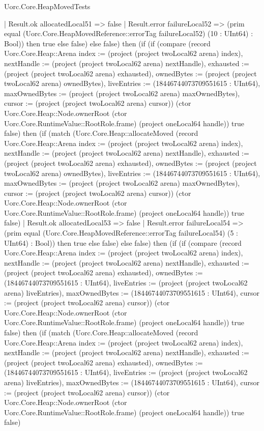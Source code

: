 \begin{lexlean}{Uorc.Core.HeapMovedTests}
\begin{semanticmodule}
{        | Result.ok allocatedLocal51 => false
        | Result.error failureLocal52 => (prim equal (Uorc.Core.HeapMovedReference::errorTag failureLocal52) (10 : UInt64) : Bool)) then true else false) else false) then (if (if (compare (record Uorc.Core.Heap::Arena {index := (project (project twoLocal62 arena) index), nextHandle := (project (project twoLocal62 arena) nextHandle), exhausted := (project (project twoLocal62 arena) exhausted), ownedBytes := (project (project twoLocal62 arena) ownedBytes), liveEntries := (18446744073709551615 : UInt64), maxOwnedBytes := (project (project twoLocal62 arena) maxOwnedBytes), cursor := (project (project twoLocal62 arena) cursor)}) (ctor Uorc.Core.Heap::Node.ownerRoot (ctor Uorc.Core.RuntimeValue::RootRole.frame) (project oneLocal64 handle)) true false) then (if (match (Uorc.Core.Heap::allocateMoved (record Uorc.Core.Heap::Arena {index := (project (project twoLocal62 arena) index), nextHandle := (project (project twoLocal62 arena) nextHandle), exhausted := (project (project twoLocal62 arena) exhausted), ownedBytes := (project (project twoLocal62 arena) ownedBytes), liveEntries := (18446744073709551615 : UInt64), maxOwnedBytes := (project (project twoLocal62 arena) maxOwnedBytes), cursor := (project (project twoLocal62 arena) cursor)}) (ctor Uorc.Core.Heap::Node.ownerRoot (ctor Uorc.Core.RuntimeValue::RootRole.frame) (project oneLocal64 handle)) true false)
        | Result.ok allocatedLocal53 => false
        | Result.error failureLocal54 => (prim equal (Uorc.Core.HeapMovedReference::errorTag failureLocal54) (5 : UInt64) : Bool)) then true else false) else false) then (if (if (compare (record Uorc.Core.Heap::Arena {index := (project (project twoLocal62 arena) index), nextHandle := (project (project twoLocal62 arena) nextHandle), exhausted := (project (project twoLocal62 arena) exhausted), ownedBytes := (18446744073709551615 : UInt64), liveEntries := (project (project twoLocal62 arena) liveEntries), maxOwnedBytes := (18446744073709551615 : UInt64), cursor := (project (project twoLocal62 arena) cursor)}) (ctor Uorc.Core.Heap::Node.ownerRoot (ctor Uorc.Core.RuntimeValue::RootRole.frame) (project oneLocal64 handle)) true false) then (if (match (Uorc.Core.Heap::allocateMoved (record Uorc.Core.Heap::Arena {index := (project (project twoLocal62 arena) index), nextHandle := (project (project twoLocal62 arena) nextHandle), exhausted := (project (project twoLocal62 arena) exhausted), ownedBytes := (18446744073709551615 : UInt64), liveEntries := (project (project twoLocal62 arena) liveEntries), maxOwnedBytes := (18446744073709551615 : UInt64), cursor := (project (project twoLocal62 arena) cursor)}) (ctor Uorc.Core.Heap::Node.ownerRoot (ctor Uorc.Core.RuntimeValue::RootRole.frame) (project oneLocal64 handle)) true false)
}
\end{semanticmodule}
\end{lexlean}
